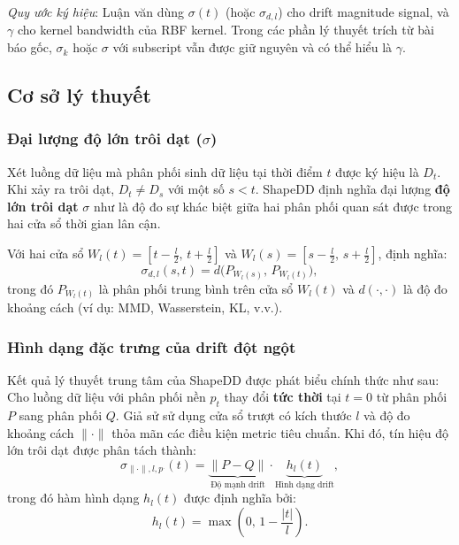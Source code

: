 \textit{Quy ước ký hiệu}: Luận văn dùng $\sigma(t)$ (hoặc $\sigma_{d,l}$) cho drift magnitude signal, và $\gamma$ cho kernel bandwidth của RBF kernel. Trong các phần lý thuyết trích từ bài báo gốc, $\sigma_k$ hoặc $\sigma$ với subscript vẫn được giữ nguyên và có thể hiểu là $\gamma$.

\subsection{Cơ sở lý thuyết}

\subsubsection{Đại lượng độ lớn trôi dạt (\texorpdfstring{$\sigma$}{σ})}

Xét luồng dữ liệu mà phân phối sinh dữ liệu tại thời điểm $t$ được ký hiệu là $D_t$. Khi xảy ra trôi dạt, $D_t \neq D_s$ với một số $s < t$.
ShapeDD định nghĩa đại lượng \textbf{độ lớn trôi dạt} $\sigma$ như là độ đo sự khác biệt giữa hai phân phối quan sát được trong hai cửa sổ thời gian lân cận.

Với hai cửa sổ $W_l(t) = [t - \frac{l}{2}, \, t + \frac{l}{2}]$ và $W_l(s) = [s - \frac{l}{2}, \, s + \frac{l}{2}]$, định nghĩa:
\begin{equation}
	\sigma_{d,l}(s,t) = d \big( P_{W_l(s)}, \, P_{W_l(t)} \big),
\end{equation}
trong đó $P_{W_l(t)}$ là phân phối trung bình trên cửa sổ $W_l(t)$ và $d(\cdot,\cdot)$ là độ đo khoảng cách (ví dụ: MMD, Wasserstein, KL, v.v.).

\subsubsection{Hình dạng đặc trưng của drift đột ngột}
\label{thm:triangle_shape}
Kết quả lý thuyết trung tâm của ShapeDD được phát biểu chính thức như sau: Cho luồng dữ liệu với phân phối nền $p_t$ thay đổi \textbf{tức thời} tại $t=0$ từ phân phối $P$ sang phân phối $Q$. Giả sử sử dụng cửa sổ trượt có kích thước $l$ và độ đo khoảng cách $\|\cdot\|$ thỏa mãn các điều kiện metric tiêu chuẩn. Khi đó, tín hiệu độ lớn trôi dạt được phân tách thành:
\begin{equation}
	\sigma_{\parallel \cdot \parallel, l, p^\cdot}(t)
	= \underbrace{ \| P - Q \| }_{\text{Độ mạnh drift}} \cdot
	\underbrace{ h_l(t) }_{\text{Hình dạng drift}},
\end{equation}
trong đó hàm hình dạng $h_l(t)$ được định nghĩa bởi:
\begin{equation}
	h_l(t) = \max\left( 0, \, 1 - \frac{|t|}{l} \right).
\end{equation}

